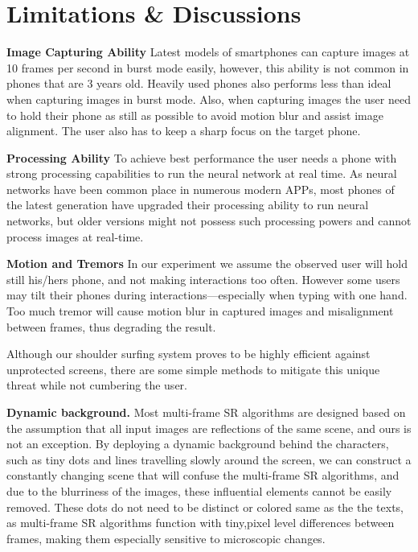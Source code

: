 \section{Limitations \& Discussions}
\label{sec-limitations-and-discussions}

\vspace{1mm}
\noindent
\textbf{Image Capturing Ability}
Latest models of smartphones can capture images at 10 frames per second in burst mode easily, however, this ability is not common in phones that are 3 years old. Heavily used phones also performs less than ideal when capturing images in burst mode. Also, when capturing images the user need to hold their phone as still as possible to avoid motion blur and assist image alignment. The user also has to keep a sharp focus on the target phone.

\vspace{1mm}
\noindent
\textbf{Processing Ability}
To achieve best performance the user needs a phone with strong processing capabilities to run the neural network at real time. As neural networks have been common place in numerous modern APPs, most phones of the latest generation have upgraded their processing ability to run neural networks, but older versions might not possess such processing powers and cannot process images at real-time.

\vspace{1mm}
\noindent
\textbf{Motion and Tremors}
In our experiment we assume the observed user will hold still his/hers phone, and not making interactions too often. However some users may tilt their phones during interactions—especially when typing with one hand. Too much tremor will cause motion blur in captured images and misalignment between frames, thus degrading the result.

Although our shoulder surfing system proves to be highly efficient against unprotected screens, there are some simple methods to mitigate this unique threat while not cumbering the user.

\vspace{1mm}
\noindent
\textbf{Dynamic background.} Most multi-frame SR algorithms are designed based on the assumption that all input images are reflections of the same scene, and ours is not an exception. By deploying a dynamic background behind the characters, such as tiny dots and lines travelling slowly around the screen, we can construct a constantly changing scene that will confuse the multi-frame SR algorithms, and due to the blurriness of the images, these influential elements cannot be easily removed. These dots do not need to be distinct or colored same as the the texts, as multi-frame SR algorithms function with tiny,pixel level differences between frames, making them especially sensitive to microscopic changes.

